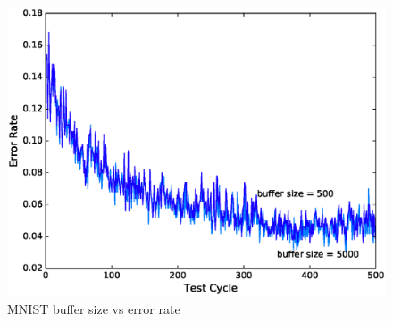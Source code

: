 \documentclass{vldb}
\begin{document}
\begin{figure}[!ht]
\centering
\includegraphics[width=\columnwidth]{../images/experiment-results/mnist-buffer-size}
\caption{MNIST buffer size vs error rate}
\label{fig:mnist-buffer-size}
\end{figure}
\end{document}
